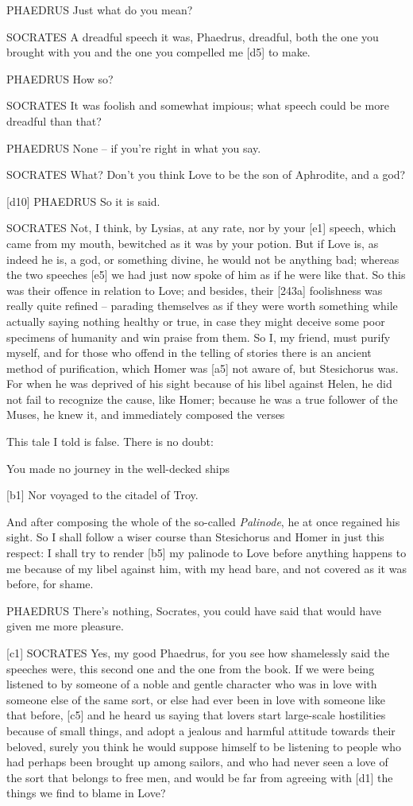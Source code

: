 PHAEDRUS Just what do you mean?

SOCRATES A dreadful speech it was, Phaedrus, dreadful, both the one you
brought with you and the one you compelled me {[}d5{]} to make.

PHAEDRUS How so?

SOCRATES It was foolish and somewhat impious; what speech could be more
dreadful than that?

PHAEDRUS None -- if you're right in what you say.

SOCRATES What? Don't you think Love to be the son of Aphrodite, and a
god?

{[}d10{]} PHAEDRUS So it is said.

SOCRATES Not, I think, by Lysias, at any rate, nor by your {[}e1{]}
speech, which came from my mouth, bewitched as it was by your
potion. But if Love is,
as indeed he is, a god, or something divine, he would not be anything
bad; whereas the two speeches {[}e5{]} we had just now spoke of him as
if he were like that. So this was their offence in relation to Love; and
besides, their {[}243a{]} foolishness was really quite refined --
parading themselves as if they were worth something while actually
saying nothing healthy or true, in case they might deceive some poor
specimens of humanity and win praise from them. So I, my friend, must
purify myself, and for those who offend in the telling of stories there
is an ancient method of purification, which Homer was {[}a5{]} not aware
of, but Stesichorus was.
For when he was deprived of his sight because of his libel against
Helen, he did not fail to recognize the cause, like Homer; because he
was a true follower of the
Muses, he knew it, and
immediately composed the verses

This tale I told is false. There is no doubt:

You made no journey in the well-decked ships

{[}b1{]} Nor voyaged to the citadel of
Troy.

And after composing the whole of the so-called
{\em Palinode}, he at
once regained his sight. So I shall follow a wiser course than
Stesichorus and Homer in just this respect: I shall try to render
{[}b5{]} my palinode to Love before anything happens to me because of my
libel against him, with my head bare, and not covered as it was before,
for shame.

PHAEDRUS There's nothing, Socrates, you could have said that would have
given me more pleasure.

{[}c1{]} SOCRATES Yes, my good Phaedrus, for you see how shamelessly
said the speeches were, this second one and the one from the book. If we
were being listened to by someone of a noble and gentle character who
was in love with someone else of the same sort, or else had ever been in
love with someone like that before, {[}c5{]} and he heard us saying that
lovers start large-scale hostilities because of small things, and adopt
a jealous and harmful attitude towards their beloved, surely you think
he would suppose himself to be listening to people who had perhaps been
brought up among sailors, and who had never seen a love of the sort that
belongs to free men, and
would be far from agreeing with {[}d1{]} the things we find to blame in
Love?

